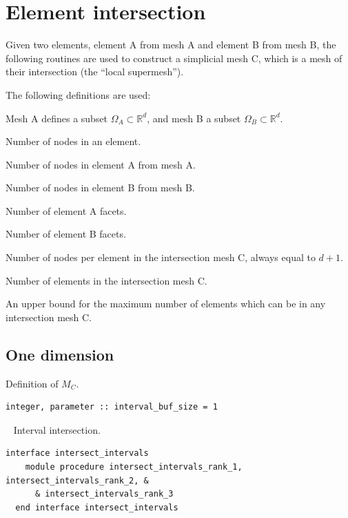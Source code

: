 \documentclass{article}
\begin{document}
\section{Element intersection}

Given two elements, element A from mesh A and element B from mesh B, the
following routines are used to construct a simplicial mesh C, which is a mesh of
their intersection (the ``local supermesh'').

The following definitions are used:
\begin{description}[leftmargin=\parindent,labelindent=\parindent]
  \item[$d$] Mesh A defines a subset $\Omega_A \subset \mathbb{R}^d$, and mesh B
    a subset $\Omega_B \subset \mathbb{R}^d$.
  \item[$l$] Number of nodes in an element.
  \item[$l_A$] Number of nodes in element A from mesh A.
  \item[$l_B$] Number of nodes in element B from mesh B.
  \item[$F_A$] Number of element A facets.
  \item[$F_B$] Number of element B facets.
  \item[$l_C$] Number of nodes per element in the intersection mesh C, always
               equal to $d + 1$.
  \item[$E_C$] Number of elements in the intersection mesh C.
  \item[$M_C$] An upper bound for the maximum number of elements which can be
               in any intersection mesh C.
\end{description}

\subsection{One dimension}\label{sect:1D_intersection}

Definition of $M_C$.
  
\begin{lstlisting}[language=FORTRAN] 
  integer, parameter :: interval_buf_size = 1
\end{lstlisting}

~\newline
Interval intersection.
  
\begin{lstlisting}[language=FORTRAN]    
  interface intersect_intervals
    module procedure intersect_intervals_rank_1, intersect_intervals_rank_2, &
      & intersect_intervals_rank_3
  end interface intersect_intervals
\end{lstlisting}
\end{document}
